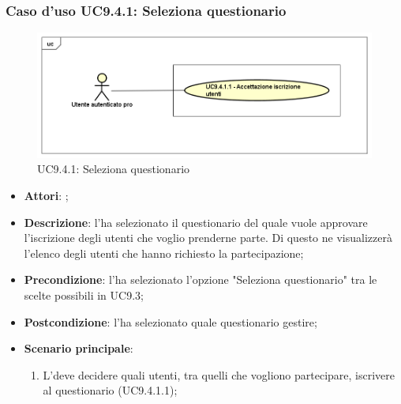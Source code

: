 		 \subsubsection{Caso d'uso UC9.4.1: Seleziona questionario}
		 \label{UC9.4.1}
		 \begin{figure}[h]
		 	\centering
		 	\includegraphics[scale=0.5,keepaspectratio]{UML/UC9_4_1.png}
		 	\caption{UC9.4.1: Seleziona questionario}
		 \end{figure}
		 \FloatBarrier
		 \begin{itemize}
		 	\item \textbf{Attori}: \uaupro;
		 	\item \textbf{Descrizione}: l'\uaupro ha selezionato il questionario del quale vuole approvare l'iscrizione degli utenti che voglio prenderne parte. Di questo ne visualizzerà l'elenco degli utenti che hanno richiesto la partecipazione; 
		 	\item \textbf{Precondizione}: l'\uaupro ha selezionato l'opzione "Seleziona questionario" tra le scelte possibili in UC9.3;
		 	\item \textbf{Postcondizione}: l'\uaupro ha selezionato quale questionario gestire;
		 	\item \textbf{Scenario principale}:
		 	\begin{enumerate}
		 		\item L'\uaupro deve decidere quali utenti, tra quelli che vogliono partecipare, iscrivere al questionario (UC9.4.1.1);
		 	\end{enumerate}
		 \end{itemize}
		 
